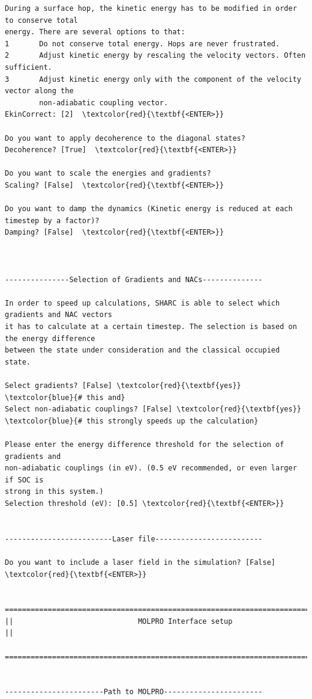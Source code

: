 \documentclass[a4paper,11pt,DIV=15,openany]{scrbook}
\begin{document}
\begin{oframed}
\begin{Verbatim}[commandchars=\\\{\}]
During a surface hop, the kinetic energy has to be modified in order to conserve total 
energy. There are several options to that:
1       Do not conserve total energy. Hops are never frustrated.
2       Adjust kinetic energy by rescaling the velocity vectors. Often sufficient.
3       Adjust kinetic energy only with the component of the velocity vector along the 
        non-adiabatic coupling vector.
EkinCorrect: [2]  \textcolor{red}{\textbf{<ENTER>}}

Do you want to apply decoherence to the diagonal states?
Decoherence? [True]  \textcolor{red}{\textbf{<ENTER>}}

Do you want to scale the energies and gradients?
Scaling? [False]  \textcolor{red}{\textbf{<ENTER>}}

Do you want to damp the dynamics (Kinetic energy is reduced at each timestep by a factor)?
Damping? [False]  \textcolor{red}{\textbf{<ENTER>}}



---------------Selection of Gradients and NACs--------------

In order to speed up calculations, SHARC is able to select which gradients and NAC vectors 
it has to calculate at a certain timestep. The selection is based on the energy difference 
between the state under consideration and the classical occupied state.

Select gradients? [False] \textcolor{red}{\textbf{yes}}                      \textcolor{blue}{# this and}
Select non-adiabatic couplings? [False] \textcolor{red}{\textbf{yes}}        \textcolor{blue}{# this strongly speeds up the calculation}

Please enter the energy difference threshold for the selection of gradients and 
non-adiabatic couplings (in eV). (0.5 eV recommended, or even larger if SOC is 
strong in this system.)
Selection threshold (eV): [0.5] \textcolor{red}{\textbf{<ENTER>}}


-------------------------Laser file-------------------------

Do you want to include a laser field in the simulation? [False] \textcolor{red}{\textbf{<ENTER>}}

  ================================================================================
||                             MOLPRO Interface setup                             ||
  ================================================================================


-----------------------Path to MOLPRO-----------------------


\end{Verbatim}
\end{oframed}
\end{document}
